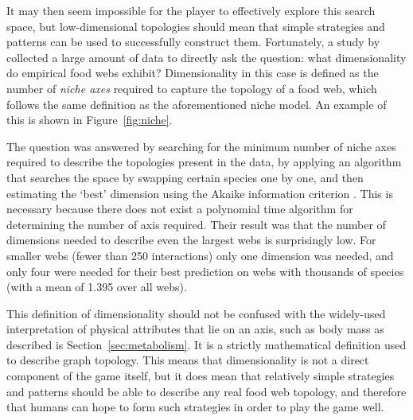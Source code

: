 It may then seem impossible for the player to effectively explore this search space, but low-dimensional topologies should mean that simple strategies and patterns can be used to successfully construct them.
Fortunately, a study by \citet{Eklof2013} collected a large amount of data to directly ask the question: what dimensionality do empirical food webs exhibit? Dimensionality in this case is defined as the number of \emph{niche axes} required to capture the topology of a food web, which follows the same definition as the aforementioned niche model. An example of this is shown in Figure~\ref{fig:niche}.

The question was answered by searching for the minimum number of niche axes required to describe the topologies present in the data, by applying an algorithm that searches the space by swapping certain species one by one, and then estimating the `best' dimension using the Akaike information criterion \citep{Eklof2013}. This is necessary because there does not exist a polynomial time algorithm for determining the number of axis required.
Their result was that the number of dimensions needed to describe even the largest webs is surprisingly low. For smaller webs (fewer than 250 interactions) only one dimension was needed, and only four were needed for their best prediction on webs with thousands of species (with a mean of 1.395 over all webs).

This definition of dimensionality should not be confused with the widely-used interpretation of physical attributes that lie on an axis, such as body mass as described is Section~\ref{sec:metabolism}. It is a strictly mathematical definition used to describe graph topology.
This means that dimensionality is not a direct component of the game itself, but it does mean that relatively simple strategies and patterns should be able to describe any real food web topology, and therefore that humans can hope to form such strategies in order to play the game well.

